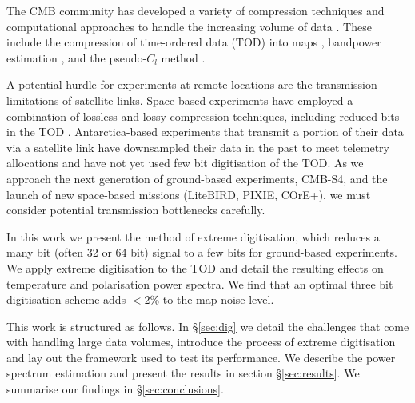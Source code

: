 \documentclass[apj]{emulateapj}
\begin{document}
The CMB community has developed a variety of compression techniques and computational approaches to handle the increasing volume of data \citep{tristam2007}. These include the compression of time-ordered data (TOD) into maps \citep{tegmark1997}, bandpower estimation \citep{tegmark1998}, and the pseudo-$C_l$ method \citep{brown2005}.

A potential hurdle for experiments at remote locations are the transmission limitations of satellite links. Space-based experiments have employed a combination of lossless and lossy compression techniques, including reduced bits in the TOD \citep{gaztanaga1998, maris2003}. Antarctica-based experiments that transmit a portion of their data via a satellite link have downsampled their data in the past to meet telemetry allocations and have not yet used few bit digitisation of the TOD. As we approach the next generation of ground-based experiments, CMB-S4, and the launch of new space-based missions (LiteBIRD, PIXIE, COrE+), we must consider potential transmission bottlenecks carefully. %

In this work we present the method of extreme digitisation, which reduces a many bit (often 32 or 64 bit) signal to a few bits for ground-based experiments. We apply extreme digitisation to the TOD and detail the resulting effects on temperature and polarisation power spectra. We find that an optimal three bit digitisation scheme adds $<2\%$ to the map noise level.

This work is structured as follows. In \S\ref{sec:dig} we detail the challenges that come with handling large data volumes, introduce the process of extreme digitisation and lay out the framework used to test its performance. We describe the power spectrum estimation and present the results in section \S\ref{sec:results}. We summarise our findings in \S\ref{sec:conclusions}.


\end{document}
